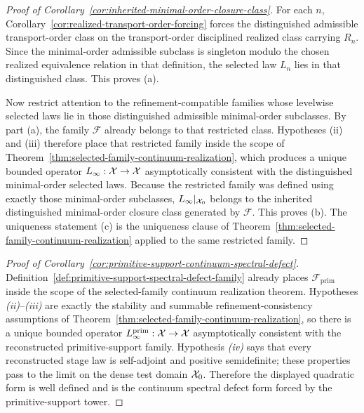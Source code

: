 \begin{proof}[Proof of Corollary~\ref{cor:inherited-minimal-order-closure-class}]
\label{proof:cor:inherited-minimal-order-closure-class}
For each \(n\), Corollary~\ref{cor:realized-transport-order-forcing} forces the
distinguished admissible transport-order class on the transport-order
disciplined realized class carrying \(R_n\). Since the minimal-order
admissible subclass is singleton modulo the chosen realized equivalence
relation in that definition, the selected law \(L_n\) lies in that
distinguished class. This proves (a).

Now restrict attention to the refinement-compatible families whose levelwise
selected laws lie in those distinguished admissible minimal-order subclasses.
By part (a), the family \(\mathcal F\) already belongs to that restricted
class. Hypotheses (ii) and (iii) therefore place that restricted family inside
the scope of Theorem~\ref{thm:selected-family-continuum-realization}, which
produces a unique bounded operator \(L_\infty:\mathcal{X}\to\mathcal{X}\) asymptotically
consistent with the distinguished minimal-order selected laws. Because the
restricted family was defined using exactly those minimal-order subclasses,
\(L_\infty|_{\mathcal{X}_0}\) belongs to the inherited distinguished minimal-order
closure class generated by \(\mathcal F\). This proves (b). The uniqueness
statement (c) is the uniqueness clause of
Theorem~\ref{thm:selected-family-continuum-realization} applied to the same
restricted family.
\end{proof}

\begin{proof}[Proof of Corollary~\ref{cor:primitive-support-continuum-spectral-defect}]
\label{proof:cor:primitive-support-continuum-spectral-defect}
Definition~\ref{def:primitive-support-spectral-defect-family} already places
\(\mathcal F_{\mathrm{prim}}\) inside the scope of the selected-family
continuum realization theorem. Hypotheses \emph{(ii)}--\emph{(iii)} are
exactly the stability and summable refinement-consistency assumptions of
Theorem~\ref{thm:selected-family-continuum-realization}, so there is a unique
bounded operator \(L_{\infty}^{\mathrm{prim}}:\mathcal{X}\to\mathcal{X}\) asymptotically
consistent with the reconstructed primitive-support family. Hypothesis
\emph{(iv)} says that every reconstructed stage law is self-adjoint and
positive semidefinite; these properties pass to the limit on the dense test
domain \(\mathcal{X}_0\). Therefore the displayed quadratic form is well defined and is
the continuum spectral defect form forced by the primitive-support tower.
\end{proof}

